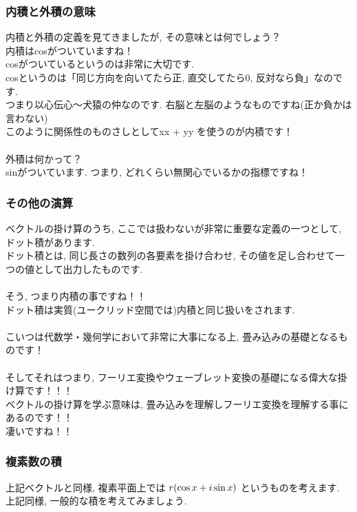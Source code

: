 \documentclass[11pt,a4paper]{jsarticle}
\begin{document}
\subsubsection{内積と外積の意味}
内積と外積の定義を見てきましたが, その意味とは何でしょう？\\
内積はcosがついていますね！\\
cosがついているというのは非常に大切です.\\
cosというのは「同じ方向を向いてたら正, 直交してたら0, 反対なら負」なのです.\\
つまり以心伝心～犬猿の仲なのです. 右脳と左脳のようなものですね(正か負かは言わない)\\
このように関係性のものさしとしてxx + yy を使うのが内積です！\\
\\
外積は何かって？\\
sinがついています. つまり, どれくらい無関心でいるかの指標ですね！

\subsubsection{その他の演算}
ベクトルの掛け算のうち, ここでは扱わないが非常に重要な定義の一つとして, ドット積があります. \\
ドット積とは, 同じ長さの数列の各要素を掛け合わせ, その値を足し合わせて一つの値として出力したものです.\\
\\
そう, つまり内積の事ですね！！\\
ドット積は実質(ユークリッド空間では)内積と同じ扱いをされます.\\
\\
こいつは代数学・幾何学において非常に大事になる上, 畳み込みの基礎となるものです！\\
\\
そしてそれはつまり, フーリエ変換やウェーブレット変換の基礎になる偉大な掛け算です！！！
\\
ベクトルの掛け算を学ぶ意味は, 畳み込みを理解しフーリエ変換を理解する事にあるのです！！\\
凄いですね！！\\

\subsubsection{複素数の積}
上記ベクトルと同様, 複素平面上では $\mathstrut r (\cos x + \mathstrut i\sin x)$ というものを考えます.\\
上記同様, 一般的な積を考えてみましょう.\\
\end{document}
